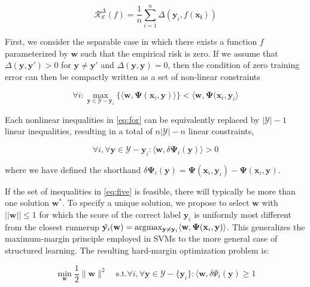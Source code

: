 \begin{equation}
\mathcal{R}^\Delta_S(f) = \frac{1}{n} \sum_{i=1}^n \Delta(\mathbf{y}_i,f(\mathbf{x_i}))
\end{equation}

First, we consider the separable case in which there exists a function $f$ parameterized by $\mathbf{w}$ such that the empirical risk is zero. If we assume that $\Delta(\mathbf{y}, \mathbf{y'}) > 0$ for $\mathbf{y} \neq \mathbf{y'}$ and $\Delta(\mathbf{y}, \mathbf{y}) = 0$, then the condition of zero training error can then be compactly written as a set of non-linear constraints

\begin{equation}
\forall i: \max_{\mathbf{y} \in \mathcal{Y}-{\mathbf{y}_i}} \{ \langle \mathbf{w}, \mathbf{\Psi}(\mathbf{x}_i, \mathbf{y}) \rangle\} < \langle \mathbf{w}, \mathbf{\Psi}(\mathbf{x}_i,\mathbf{y}_i\rangle
\label{eq:for}
\end{equation}

Each nonlinear inequalities in \ref{eq:for} can be equivalently replaced by $|\mathcal{Y}|-1$ linear inequalities, resulting in a total of $n|\mathcal{Y}| -n$ linear constraints, 

\begin{equation}
\forall i, \forall \mathbf{y} \in \mathcal{Y}-\mathbf{y}_i: \langle \mathbf{w}, \delta\mathbf{\Psi}_i(\mathbf{y}) \rangle > 0
\label{eq:five}
\end{equation}

where we have defined the shorthand $\delta\mathbf{\Psi}_i(\mathbf{y}) =  \mathbf{\Psi}(\mathbf{x}_i, \mathbf{y}_i) -  \mathbf{\Psi}(\mathbf{x}_i, \mathbf{y})$.

If the set of inequalities in \ref{eq:five} is feasible, there will typically be more than one solution $\mathbf{w}^*$. To specify a unique solution, we propose to select $\mathbf{w}$ with $||\mathbf{w}||\leq 1$ for which the score of the correct label $\mathbf{y}_i$ is uniformly most different from the closest runnerup $\hat{\mathbf{y}_i}(\mathbf{w}) = \arg\!\max_{\mathbf{y} \neq \mathbf{y}_i} \langle \mathbf{w}, \mathbf{\Psi}(\mathbf{x}_i, \mathbf{y})\rangle$. This generalizes the maximum-margin principle employed in SVMs to the more general case of structured learning. The resulting hard-margin optimization problem is:

\begin{equation} 
\min_{\mathbf{w}} \frac{1}{2} \lVert \mathbf{w} \rVert^2 \quad \text{s.t.} \forall i, \forall \mathbf{y} \in \mathcal{Y}-\{\mathbf{y}_i\}: \langle \mathbf{w},\delta\Psi_i(\mathbf{y}) \geq 1
\end{equation}

